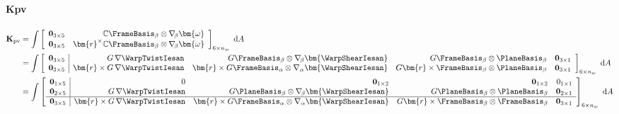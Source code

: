 \paragraph{Kpv}
$$
\begin{aligned}
\mathbf{K}_{\rm p v} 
& =\int\left[\begin{array}{rr}
\mathbf{0}_{3\times5} & \mathbb{C} \FrameBasis_\beta \otimes \nabla_{\!\beta} \bm{\omega} \\
\mathbf{0}_{3\times5} & \bm{r}^\times\mathbb{C} \FrameBasis_\beta \otimes \nabla_{\!\beta} \bm{\omega}
\end{array}\right]_{6 \times n_w}\mathrm{~d}A \\
& =\int\left[\begin{array}{c|rrrr}
\mathbf{0}_{3\times 5} & G\,\nabla  \WarpTwistIesan 
& G\FrameBasis_{\beta} \otimes \nabla_{\!\beta} \bm{\WarpShearIesan}
& G \FrameBasis_\beta \otimes \PlaneBasis_{\beta} & \mathbf{0}_{3\times1} 
\\
\mathbf{0}_{3\times 5} & \bm{r} \times G \, \nabla \WarpTwistIesan
& \bm{r} \times G \FrameBasis_\alpha \otimes \nabla_\alpha \bm{\WarpShearIesan}
& G \bm{r}\times \FrameBasis_\beta \otimes \PlaneBasis_{\beta} & \mathbf{0}_{3\times1}
\end{array}\right]_{6 \times n_w}\mathrm{~d}A \\
& =\int\left[\begin{array}{c|rrrr}
\mathbf{0}_{1\times5} & 0 & \mathbf{0}_{1\times2} & \mathbf{0}_{1\times2} & 0_{1\times1} \\
\mathbf{0}_{2\times5} & G\,\nabla  \WarpTwistIesan 
& G \PlaneBasis_{\beta} \otimes \nabla_{\!\beta} \bm{\WarpShearIesan}
& G \PlaneBasis_{\beta} \otimes \PlaneBasis_{\beta} & \mathbf{0}_{2\times1} 
\\ \hline
\mathbf{0}_{3\times 5} & \bm{r} \times G \, \nabla \WarpTwistIesan
& \bm{r} \times G \FrameBasis_\alpha \otimes \nabla_\alpha \bm{\WarpShearIesan}
& G \bm{r}\times \FrameBasis_\beta \otimes \FrameBasis_\beta & \mathbf{0}_{3\times1}
\end{array}\right]_{6 \times n_w}\mathrm{~d}A \\
\end{aligned}
$$

